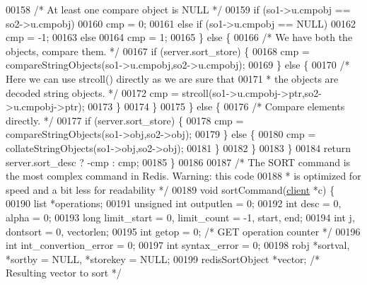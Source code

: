 \begin{DoxyCode}
00158                 \textcolor{comment}{/* At least one compare object is NULL */}
00159                 \textcolor{keywordflow}{if} (so1->u.cmpobj == so2->u.cmpobj)
00160                     cmp = 0;
00161                 \textcolor{keywordflow}{else} \textcolor{keywordflow}{if} (so1->u.cmpobj == NULL)
00162                     cmp = -1;
00163                 \textcolor{keywordflow}{else}
00164                     cmp = 1;
00165             \} \textcolor{keywordflow}{else} \{
00166                 \textcolor{comment}{/* We have both the objects, compare them. */}
00167                 \textcolor{keywordflow}{if} (server.sort\_store) \{
00168                     cmp = compareStringObjects(so1->u.cmpobj,so2->u.cmpobj);
00169                 \} \textcolor{keywordflow}{else} \{
00170                     \textcolor{comment}{/* Here we can use strcoll() directly as we are sure that}
00171 \textcolor{comment}{                     * the objects are decoded string objects. */}
00172                     cmp = strcoll(so1->u.cmpobj->ptr,so2->u.cmpobj->ptr);
00173                 \}
00174             \}
00175         \} \textcolor{keywordflow}{else} \{
00176             \textcolor{comment}{/* Compare elements directly. */}
00177             \textcolor{keywordflow}{if} (server.sort\_store) \{
00178                 cmp = compareStringObjects(so1->obj,so2->obj);
00179             \} \textcolor{keywordflow}{else} \{
00180                 cmp = collateStringObjects(so1->obj,so2->obj);
00181             \}
00182         \}
00183     \}
00184     \textcolor{keywordflow}{return} server.sort\_desc ? -cmp : cmp;
00185 \}
00186 
00187 \textcolor{comment}{/* The SORT command is the most complex command in Redis. Warning: this code}
00188 \textcolor{comment}{ * is optimized for speed and a bit less for readability */}
00189 \textcolor{keywordtype}{void} sortCommand(\hyperlink{structclient}{client} *c) \{
00190     list *operations;
00191     \textcolor{keywordtype}{unsigned} \textcolor{keywordtype}{int} outputlen = 0;
00192     \textcolor{keywordtype}{int} desc = 0, alpha = 0;
00193     \textcolor{keywordtype}{long} limit\_start = 0, limit\_count = -1, start, end;
00194     \textcolor{keywordtype}{int} j, dontsort = 0, vectorlen;
00195     \textcolor{keywordtype}{int} getop = 0; \textcolor{comment}{/* GET operation counter */}
00196     \textcolor{keywordtype}{int} int\_convertion\_error = 0;
00197     \textcolor{keywordtype}{int} syntax\_error = 0;
00198     robj *sortval, *sortby = NULL, *storekey = NULL;
00199     redisSortObject *vector; \textcolor{comment}{/* Resulting vector to sort */}

\end{DoxyCode}

